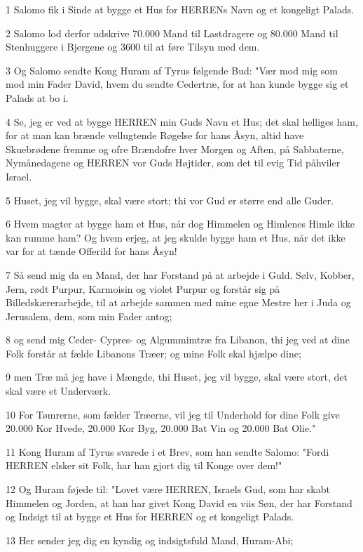 \par 1 Salomo fik i Sinde at bygge et Hus for HERRENs Navn og et kongeligt Palads.
\par 2 Salomo lod derfor udskrive 70.000 Mand til Lastdragere og 80.000 Mand til Stenhuggere i Bjergene og 3600 til at føre Tilsyn med dem.
\par 3 Og Salomo sendte Kong Huram af Tyrus følgende Bud: "Vær mod mig som mod min Fader David, hvem du sendte Cedertræ, for at han kunde bygge sig et Palads at bo i.
\par 4 Se, jeg er ved at bygge HERREN min Guds Navn et Hus; det skal helliges ham, for at man kan brænde vellugtende Røgelse for hans Åsyn, altid have Skuebrødene fremme og ofre Brændofre hver Morgen og Aften, på Sabbaterne, Nymånedagene og HERREN vor Guds Højtider, som det til evig Tid påhviler Israel.
\par 5 Huset, jeg vil bygge, skal være stort; thi vor Gud er større end alle Guder.
\par 6 Hvem magter at bygge ham et Hus, når dog Himmelen og Himlenes Himle ikke kan rumme ham? Og hvem erjeg, at jeg skulde bygge ham et Hus, når det ikke var for at tænde Offerild for hans Åsyn!
\par 7 Så send mig da en Mand, der har Forstand på at arbejde i Guld. Sølv, Kobber, Jern, rødt Purpur, Karmoisin og violet Purpur og forstår sig på Billedskærerarbejde, til at arbejde sammen med mine egne Mestre her i Juda og Jerusalem, dem, som min Fader antog;
\par 8 og send mig Ceder- Cypres- og Algummimtræ fra Libanon, thi jeg ved at dine Folk forstår at fælde Libanons Træer; og mine Folk skal hjælpe dine;
\par 9 men Træ må jeg have i Mængde, thi Huset, jeg vil bygge, skal være stort, det skal være et Underværk.
\par 10 For Tømrerne, som fælder Træerne, vil jeg til Underhold for dine Folk give 20.000 Kor Hvede, 20.000 Kor Byg, 20.000 Bat Vin og 20.000 Bat Olie."
\par 11 Kong Huram af Tyrus svarede i et Brev, som han sendte Salomo: "Fordi HERREN elsker sit Folk, har han gjort dig til Konge over dem!"
\par 12 Og Huram føjede til: "Lovet være HERREN, Israels Gud, som har skabt Himmelen og Jorden, at han har givet Kong David en viis Søn, der har Forstand og Indsigt til at bygge et Hus for HERREN og et kongeligt Palads.
\par 13 Her sender jeg dig en kyndig og indsigtsfuld Mand, Huram-Abi;
